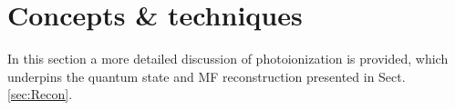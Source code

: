 \documentclass[10pt]{article}
\begin{document}
\section{Concepts \& techniques\label{sec:Concepts}}

In this section a more detailed discussion of photoionization is provided, which underpins the quantum state and MF reconstruction presented in Sect. \ref{sec:Recon}.



\end{document}
